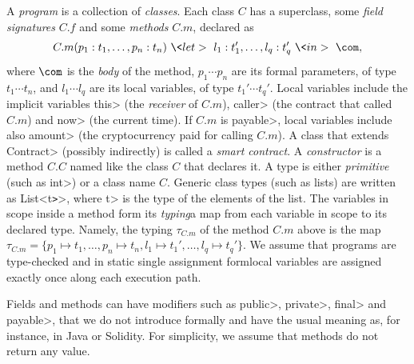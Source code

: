 \begin{definition}[Program]\label{def:program}
  A \emph{program} is a collection of \emph{classes}.
  Each class $C$ has a superclass, some \emph{field signatures} $C.f$
  and some \emph{methods} $C.m$, declared as
  \[
  C.m(p_1:t_1,\ldots,p_n:t_n)\ \<let>\ l_1:t_1',\ldots,l_q:t_q'\ \<in>\ \com,
  \]
  where $\com$ is the \emph{body} of the method, $p_1\cdots p_n$ are its
  formal parameters, of type $t_1\cdots t_n$, and $l_1\cdots l_q$ are its
  local variables, of type $t_1'\cdots t_q'$. Local variables include the
  implicit variables \<this> (the \emph{receiver} of $C.m$),
  \<caller> (the contract that called $C.m$) and \<now> (the current time).
  If $C.m$ is \<payable>, local variables include also
  \<amount> (the cryptocurrency paid for calling $C.m$).
  A class that extends \<Contract>
  (possibly indirectly) is called a \emph{smart contract}.
  A \emph{constructor} is a method $C.C$ named like the class $C$ that declares it.
  A type is either \emph{primitive} (such as \<int>)
  or a class name $C$. Generic class types (such as lists) are written as
  \<List<t\texttt{>}>, where \<t> is the type of the elements of the list.
  The variables in scope inside a method
  form its \emph{typing}\ie a map from each variable in scope to
  its declared type. Namely, the typing $\tau_{C.m}$ of the method $C.m$ above is the map
  $\tau_{C.m}=\{p_1\mapsto t_1,\ldots,p_n\mapsto t_n,l_1\mapsto t_1',\ldots,l_q\mapsto t_q'\}$.
  We assume that programs are type-checked and in static single assignment form\ie local
  variables are assigned exactly once along each execution path.
\end{definition}
%
Fields and methods can have modifiers such as \<public>, \<private>,
\<final> and \<payable>, that we do not introduce formally and have the
usual meaning as, for instance, in Java or Solidity. For simplicity, we
assume that methods do not return any value.


